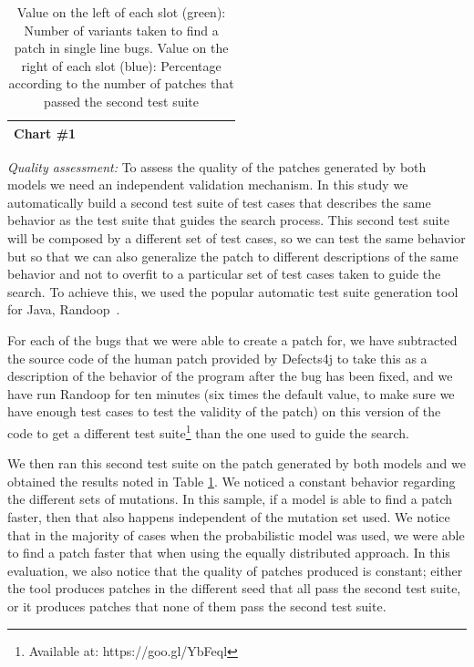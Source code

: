 \documentclass[conference]{IEEEtran}
\newcommand{\ra}[1]{\renewcommand{\arraystretch}{#1}}
\begin{document}
\begin{table}
{\begin{tabular}{|r|rr|rr|rr|rr|rr|rr|}
 Chart \#1 & \color{OliveGreen}{1.8}&\color{blue}{0\%} & \color{OliveGreen}{7.3}&\color{blue}{0\%} & \color{OliveGreen}{4.9}&\color{blue}{0\%} & \color{OliveGreen}{19.0}&\color{blue}{0\%} & \color{OliveGreen}{2.2}&\color{blue}{0\%} & \color{OliveGreen}{4.8}&\color{blue}{0\%} \\

\hline
 
\end{tabular}
}
\ra{1.3}
		\caption{Value on the left of each slot (green): Number of variants taken to find a patch in single line bugs. Value on the right of each slot (blue): Percentage according to the number of patches that passed the second test suite}\label{tab:singleLineBugs}
\end{table}


\emph{Quality assessment:}
To assess the quality of the patches generated by both models we need an
independent validation mechanism. In this study we automatically build a second
test suite of test cases that describes the same behavior as the test suite that
guides the search process. This second test suite will be composed by a
different set of test cases, so we can test the same behavior but so that we can
also generalize the patch to different descriptions of the same behavior and not
to overfit to a particular set of test cases taken to guide the search. To
achieve this, we used the popular automatic test suite generation tool for Java,
Randoop~\cite{pacheco07}. 

For each of the bugs that we were able to create a patch for, we have subtracted
the source code of the human patch provided by Defects4j to take this as a
description of the behavior of the program after the bug has been fixed, and we
have run Randoop for ten minutes (six times the default value, to make sure we
have enough test cases to test the validity of the patch) on this version of the
code to get a different test suite\footnote{Available at: https://goo.gl/YbFeql}
than the one used to guide the search.  

We then ran this second test suite on the patch generated by both models and we
obtained the results noted in Table \ref{tab:singleLineBugs}. We noticed a
constant behavior regarding the different sets of mutations. In this sample, if
a model is able to find a patch faster, then that also happens independent of
the mutation set used. We notice that in the majority of cases when the
probabilistic model was used, we were able to find a patch faster that when
using the equally distributed approach. In this evaluation, we also notice that
the quality of patches produced is constant; either the tool produces patches in
the different seed that all pass the second test suite, or it produces patches
that none of them pass the second test suite.  
\end{document}
